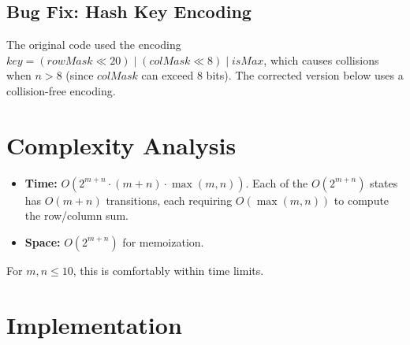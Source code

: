 \documentclass[11pt,a4paper]{article}
\begin{document}
\subsection{Bug Fix: Hash Key Encoding}

The original code used the encoding
$\textit{key} = (\textit{rowMask} \ll 20) \mid (\textit{colMask} \ll 8)
\mid \textit{isMax}$, which causes collisions when $n > 8$ (since
$\textit{colMask}$ can exceed 8 bits). The corrected version below uses a
collision-free encoding.

\section{Complexity Analysis}

\begin{itemize}
  \item \textbf{Time:} $O(2^{m+n} \cdot (m+n) \cdot \max(m,n))$. Each of
    the $O(2^{m+n})$ states has $O(m+n)$ transitions, each requiring
    $O(\max(m,n))$ to compute the row/column sum.
  \item \textbf{Space:} $O(2^{m+n})$ for memoization.
\end{itemize}

For $m, n \le 10$, this is comfortably within time limits.

\section{Implementation}
\end{document}
